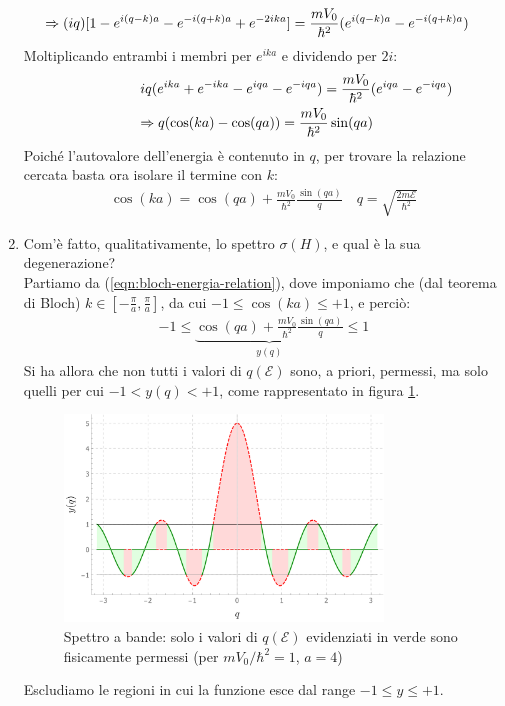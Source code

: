 \documentclass[../../FisicaTeorica.tex]{subfiles}
\begin{document}
\begin{enumerate}
\begin{align*}
\Rightarrow (iq)[1-e^{i(q-k)a}-e^{-i(q+k)a}+e^{-2ika}] = \frac{mV_0}{\hbar^2}(e^{i(q-k)a}-e^{-i(q+k)a})\span
\end{align*}
Moltiplicando entrambi i membri per $e^{ika}$ e dividendo per $2i$:
\begin{align*}
iq(e^{ika} + e^{-ika} - e^{iqa} - e^{-iqa})=\frac{mV_0}{\hbar^2} (e^{iqa}- e^{-iqa})\\
\Rightarrow q(\cos(ka)-\cos(qa)) = \frac{mV_0}{\hbar^2}\sin(qa)\span
\end{align*}
Poiché l'autovalore dell'energia è contenuto in $q$, per trovare la relazione cercata basta ora isolare il termine con $k$:
\begin{align}
\cos(ka) = \cos(qa) + \frac{mV_0}{\hbar^2} \frac{\sin(qa)}{q} \quad q=\sqrt{\frac{2m\mathcal{E}}{\hbar^2}}
\label{eqn:bloch-energia-relation}
\end{align}
\item Com'è fatto, qualitativamente, lo spettro $\sigma(H)$, e qual è la sua degenerazione?\\
Partiamo da (\ref{eqn:bloch-energia-relation}), dove imponiamo che (dal teorema di Bloch) $k \in \left[-\frac{\pi}{a}, \frac{\pi}{a}\right]$, da cui $-1 \leq \cos(ka)\leq +1$, e perciò:
\begin{align*}
-1 \leq \underbrace{\cos(qa) + \frac{mV_0}{\hbar^2} \frac{\sin(qa)}{q}}_{y(q)}\leq 1
\end{align*} 
Si ha allora che non tutti i valori di $q(\mathcal{E})$ sono, a priori, permessi, ma solo quelli per cui $-1 < y(q) < +1$, come rappresentato in figura \ref{fig:bande}.

\begin{figure}[H]
\centering
\includegraphics[width=0.8\textwidth]{Immagini/13_12/plot1.pdf}
\caption{Spettro a bande: solo i valori di $q(\mathcal{E})$ evidenziati in verde sono fisicamente permessi (per $mV_0/\hbar^2=1$, $a=4$)\label{fig:bande}}
\end{figure}
Escludiamo le regioni in cui la funzione esce dal range $-1 \leq y \leq +1$.\\


\end{enumerate}
\end{document}
